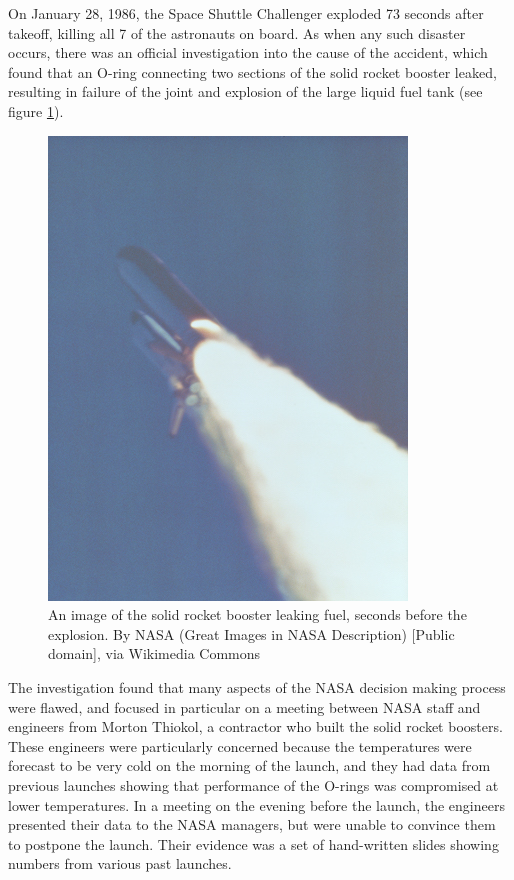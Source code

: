 \documentclass[12pt,]{book}
\theoremstyle{definition}
\theoremstyle{definition}
\theoremstyle{definition}
\theoremstyle{remark}
\begin{document}
On January 28, 1986, the Space Shuttle Challenger exploded 73 seconds after takeoff, killing all 7 of the astronauts on board. As when any such disaster occurs, there was an official investigation into the cause of the accident, which found that an O-ring connecting two sections of the solid rocket booster leaked, resulting in failure of the joint and explosion of the large liquid fuel tank (see figure \ref{fig:srbLeak}).

\begin{figure}
\includegraphics[height=0.2\textheight]{images/Booster_Rocket_Breach_-_GPN-2000-001425} \caption{An image of the solid rocket booster leaking fuel, seconds before the explosion. By NASA (Great Images in NASA Description) [Public domain], via Wikimedia Commons}\label{fig:srbLeak}
\end{figure}

The investigation found that many aspects of the NASA decision making process were flawed, and focused in particular on a meeting between NASA staff and engineers from Morton Thiokol, a contractor who built the solid rocket boosters. These engineers were particularly concerned because the temperatures were forecast to be very cold on the morning of the launch, and they had data from previous launches showing that performance of the O-rings was compromised at lower temperatures. In a meeting on the evening before the launch, the engineers presented their data to the NASA managers, but were unable to convince them to postpone the launch. Their evidence was a set of hand-written slides showing numbers from various past launches.
\end{document}
